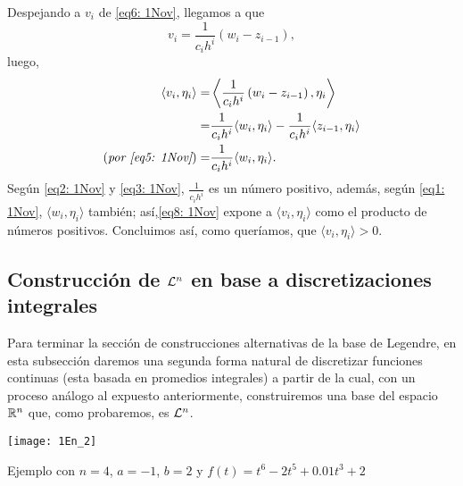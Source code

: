 \begin{itemize}
Despejando a $v_{i}$ de \eqref{eq6: 1Nov}, llegamos a que
\begin{equation}
\label{eq7: 1Nov}
v_{i}= \frac{1}{c_{i}h^{i}} \left( w_{i} -  z_{i-1} \right),
\end{equation}
luego,
\begin{align}
\label{eq8: 1Nov}
\left\langle v_{i}, \eta_{i} \right\rangle = & 
\left\langle \frac{1}{c_{i}h^{i}} \left( w_{i} -  z_{i-1} \right), \eta_{i} 
 \right\rangle \nonumber \\
= & \frac{1}{c_{i}h^{i}} \langle w_{i}, \eta_{i} \rangle -
\frac{1}{c_{i}h^{i}} \langle z_{i-1}, \eta_{i} \rangle \nonumber \\
(\textit{por \eqref{eq5: 1Nov}}) = & \frac{1}{c_{i}h^{i}} \langle w_{i}, \eta_{i} \rangle.
\end{align}
Según 
\eqref{eq2: 1Nov} y 
\eqref{eq3: 1Nov}, $\frac{1}{c_{i}h^{i}}$ es
un número positivo, además, según 
\eqref{eq1: 1Nov}, $\langle w_{i}, \eta_{i} \rangle$ también;
así,\eqref{eq8: 1Nov} expone a $\langle v_{i}, \eta_{i} \rangle$
como el producto de números positivos. 
Concluimos así, como queríamos,
que $\langle v_{i}, \eta_{i} \rangle>0$.
\QEDB
\vspace{0.2cm}


\end{itemize}

\subsection{Construcción de $\mathcal{L}^{n}$ en base a discretizaciones integrales}
\label{Construcción de Ln en base a discretizaciones con sumas integrales}
Para terminar la sección de construcciones alternativas
de la base de Legendre,
en esta subsección daremos una segunda
forma natural de discretizar funciones continuas
(esta basada en promedios integrales) a partir de 
la cual, con un proceso análogo al expuesto
anteriormente,
construiremos una base del espacio $\mathbb{R}^{n}$
que, como probaremos, es $\mathcal{L}^{n}$.

\begin{marginfigure}
\texttt{[image: 1En\_2]} 
		\caption{Ejemplo con $n=4$, $a=-1$, $b=2$ y
		$f(t)= t^{6}-2t^{5}+0.01t^{3}+2$}
\end{marginfigure}


